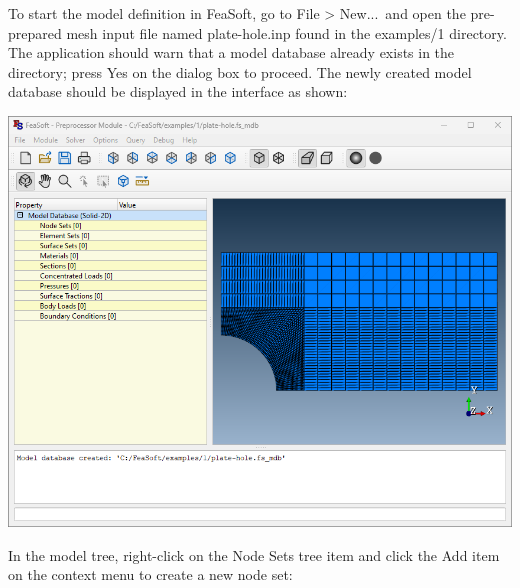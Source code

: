 \documentclass[
    11pt,        %
    a4paper,     %
    final,       %
    fleqn,       %
    notitlepage, %
    onecolumn,   %
    oneside,     %
]{article}
\begin{document}
To start the model definition in FeaSoft, go to File > New...\ and open the pre-prepared mesh input file named plate-hole.inp found in the examples/1 directory. The application should warn that a model database already exists in the directory; press Yes on the dialog box to proceed. The newly created model database should be displayed in the interface as shown:
\begin{center}
    \includegraphics[scale=0.5]{fig/ui-1-1.png}
\end{center}

In the model tree, right-click on the Node Sets tree item and click the Add item on the context menu to create a new node set:
\begin{center}
\end{center}
\end{document}
